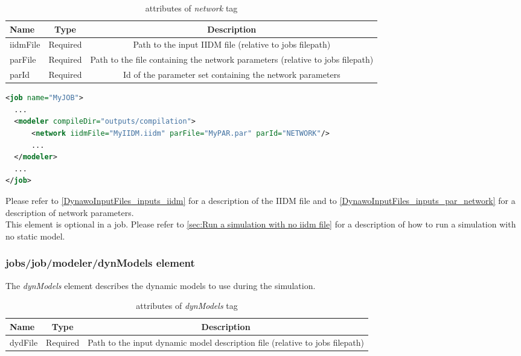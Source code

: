 \documentclass[a4paper, 12pt]{report}
\begin{document}
\begin{table}[H]
\center
\begin{tabular}{ l | c | c }
\toprule
\textbf{{Name}} & \textbf{{Type}} & \textbf{{Description}}\\
\midrule
\rowcolor{white}
\small{iidmFile} & \small{Required} & \small{Path to the input IIDM file (relative to jobs filepath)}\\
\rowcolor{gray!10}
\small{parFile} & \small{Required} & \small{Path to the file containing the network parameters (relative to jobs filepath)}\\
\rowcolor{white}
\small{parId} & \small{Required} & \small{Id of the parameter set containing the network parameters}\\
\bottomrule
\end{tabular}
\caption{attributes of \textit{network} tag}
\end{table}

\begin{lstlisting}[language=XML, morekeywords={network}]
<job name="MyJOB">
  ...
  <modeler compileDir="outputs/compilation">
      <network iidmFile="MyIIDM.iidm" parFile="MyPAR.par" parId="NETWORK"/>
      ...
  </modeler>
  ...
</job>
\end{lstlisting}

Please refer to \ref{DynawoInputFiles_inputs_iidm} for a description of the IIDM file and to \ref{DynawoInputFiles_inputs_par_network} for a description of network parameters.\\

This element is optional in a job. Please refer to \ref{sec:Run a simulation with no iidm file} for a description of how to run a simulation with no static model.

\subsubsection{jobs/job/modeler/dynModels element}
\label{DynawoInputFiles_inputs_jobs_job_modeler_dynModels}

The \textit{dynModels} element describes the dynamic models to use during the simulation.

\begin{table}[H]
\center
\begin{tabular}{ l | c | c }
\toprule
\textbf{{Name}} & \textbf{{Type}} & \textbf{{Description}}\\
\midrule
\rowcolor{white}
\small{dydFile} & \small{Required} & \small{Path to the input dynamic model description file (relative to jobs filepath)}\\
\bottomrule
\end{tabular}
\caption{attributes of \textit{dynModels} tag}
\end{table}
\end{document}
